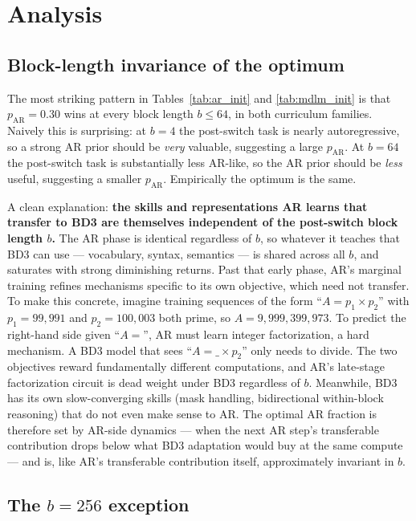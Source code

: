 \documentclass{article}
\newcommand{\pAR}{p_{\mathrm{AR}}}
\begin{document}
\section{Analysis}
\label{sec:analysis}

\subsection{Block-length invariance of the optimum}

The most striking pattern in Tables~\ref{tab:ar_init} and \ref{tab:mdlm_init} is that $\pAR{=}0.30$ wins at every block length $b \le 64$, in both curriculum families. Naively this is surprising: at $b{=}4$ the post-switch task is nearly autoregressive, so a strong AR prior should be \emph{very} valuable, suggesting a large $\pAR$. At $b{=}64$ the post-switch task is substantially less AR-like, so the AR prior should be \emph{less} useful, suggesting a smaller $\pAR$. Empirically the optimum is the same.

A clean explanation: \textbf{the skills and representations AR learns that transfer to BD3 are themselves independent of the post-switch block length $b$.} The AR phase is identical regardless of $b$, so whatever it teaches that BD3 can use --- vocabulary, syntax, semantics --- is shared across all $b$, and saturates with strong diminishing returns. Past that early phase, AR's marginal training refines mechanisms specific to its own objective, which need not transfer. To make this concrete, imagine training sequences of the form ``$A = p_1 \times p_2$'' with $p_1{=}99{,}991$ and $p_2{=}100{,}003$ both prime, so $A{=}9{,}999{,}399{,}973$. To predict the right-hand side given ``$A=$'', AR must learn integer factorization, a hard mechanism. A BD3 model that sees ``$A = \_ \times p_2$'' only needs to divide. The two objectives reward fundamentally different computations, and AR's late-stage factorization circuit is dead weight under BD3 regardless of $b$. Meanwhile, BD3 has its own slow-converging skills (mask handling, bidirectional within-block reasoning) that do not even make sense to AR. The optimal AR fraction is therefore set by AR-side dynamics --- when the next AR step's transferable contribution drops below what BD3 adaptation would buy at the same compute --- and is, like AR's transferable contribution itself, approximately invariant in $b$.

\subsection{The $b{=}256$ exception}
\end{document}

